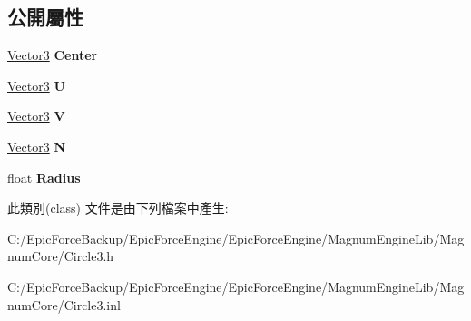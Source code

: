 \subsection*{公開屬性}
\begin{DoxyCompactItemize}
\item 
\hyperlink{class_magnum_1_1_vector3}{Vector3} {\bfseries Center}\hypertarget{class_magnum_1_1_circle3_a68e959e7b09995bfe1e5678dacc08e3b}{}\label{class_magnum_1_1_circle3_a68e959e7b09995bfe1e5678dacc08e3b}

\item 
\hyperlink{class_magnum_1_1_vector3}{Vector3} {\bfseries U}\hypertarget{class_magnum_1_1_circle3_aba538662d73e149a4ad190e7f1f6a2c9}{}\label{class_magnum_1_1_circle3_aba538662d73e149a4ad190e7f1f6a2c9}

\item 
\hyperlink{class_magnum_1_1_vector3}{Vector3} {\bfseries V}\hypertarget{class_magnum_1_1_circle3_a6cb4590451eddca7a5d7a991da878750}{}\label{class_magnum_1_1_circle3_a6cb4590451eddca7a5d7a991da878750}

\item 
\hyperlink{class_magnum_1_1_vector3}{Vector3} {\bfseries N}\hypertarget{class_magnum_1_1_circle3_a34cee4f062d1a6353ea8f6d3f5f06259}{}\label{class_magnum_1_1_circle3_a34cee4f062d1a6353ea8f6d3f5f06259}

\item 
float {\bfseries Radius}\hypertarget{class_magnum_1_1_circle3_ae44b37e491cc9e69cd355abc3cd17340}{}\label{class_magnum_1_1_circle3_ae44b37e491cc9e69cd355abc3cd17340}

\end{DoxyCompactItemize}


此類別(class) 文件是由下列檔案中產生\+:\begin{DoxyCompactItemize}
\item 
C\+:/\+Epic\+Force\+Backup/\+Epic\+Force\+Engine/\+Epic\+Force\+Engine/\+Magnum\+Engine\+Lib/\+Magnum\+Core/Circle3.\+h\item 
C\+:/\+Epic\+Force\+Backup/\+Epic\+Force\+Engine/\+Epic\+Force\+Engine/\+Magnum\+Engine\+Lib/\+Magnum\+Core/Circle3.\+inl\end{DoxyCompactItemize}

